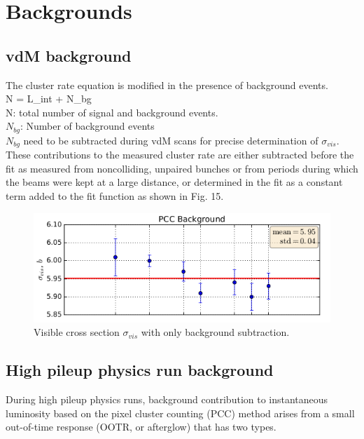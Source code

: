\section{Backgrounds}
\label{sec:bkg}
\subsection{vdM background}

The cluster rate equation is modified in the presence of background events.\\

N = \sigma \:L_{int} + N_{bg} \\

N: total number of signal and background events. \\

$N_{bg}$: Number of background events \\

$N_{bg}$ need to be subtracted during vdM scans for precise determination of $\sigma_{vis}$. These contributions to the measured cluster rate are either subtracted before the fit as measured from noncolliding, unpaired bunches or from periods during which the beams were kept at a large distance, or determined in the fit as a constant term added to the fit function as shown in Fig. 15.

\begin{figure}[H]
  \centering
  \includegraphics[width=0.7\columnwidth]{./PCC_bg.png}
  \caption{ \onehalfspacing Visible cross section $\sigma_{vis}$ with only background subtraction.}
  \label{fig:CMS}
\end{figure}


\subsection{High pileup physics run background}

During high pileup physics runs, background contribution to instantaneous luminosity based on the pixel cluster counting (PCC) method arises from a small out-of-time response (OOTR, or afterglow) that has two types.\\

